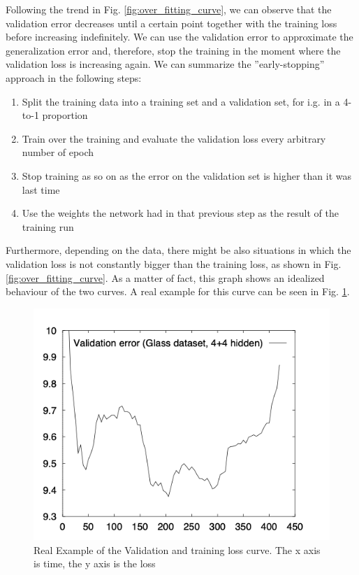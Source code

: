 Following the trend in Fig. \ref{fig:over_fitting_curve}, we can observe that the validation error decreases until a certain point together with the training loss before increasing indefinitely. We can use the validation error to approximate the generalization error and, therefore, stop the training in the moment where the validation loss is increasing again. 
We can summarize the ''early-stopping'' approach in the following steps:
\begin{enumerate}
\item Split the training data into a training set and a validation set, for i.g. in a 4-to-1 proportion
\item Train over the training and evaluate the validation loss every arbitrary number of epoch
\item Stop training as so on as the error on the validation set is         higher than it was last time
\item Use the weights the network had in that previous step as the result of the training run

\end{enumerate}
Furthermore, depending on the data, there might be also situations in which the validation loss is not constantly bigger than the training loss, as shown in Fig. \ref{fig:over_fitting_curve}. As a matter of fact, this graph shows an idealized behaviour of the two curves. A real example for this curve can be seen in Fig. \ref{fig:over_fitting_curve_real}.
\begin{figure}[htb]
    \centering
    \includegraphics[scale = 0.4]{img/over_fitting_real.png}
    \caption[Real Example of the Validation and training loss curve]{Real Example of the Validation and training loss curve. The x axis is time, the y axis is the loss \cite{early_stopping}}
    \label{fig:over_fitting_curve_real}
\end{figure}

